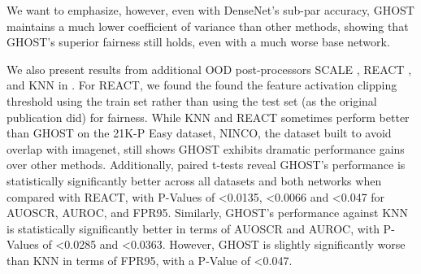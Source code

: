 We want to emphasize, however, even with DenseNet's sub-par accuracy, GHOST maintains a much lower coefficient of  variance than other methods, showing that GHOST's superior fairness still holds, even with a much worse base network.

We also present results from additional OOD post-processors SCALE \cite{xu2024scaling}, REACT \cite{sun2021react}, and KNN \cite{sun2022out} in . 
For REACT, we found the found the feature activation clipping threshold using the train set rather than using the test set (as the original publication did) for fairness.
While KNN and REACT sometimes perform better than GHOST on the 21K-P Easy dataset, NINCO, the dataset built to avoid overlap with imagenet, still shows GHOST exhibits dramatic performance gains over other methods.
Additionally, paired t-tests reveal GHOST's performance is statistically significantly better across all datasets and both networks when compared with REACT, with P-Values of <0.0135, <0.0066 and <0.047 for AUOSCR, AUROC, and FPR95.
Similarly, GHOST's performance against KNN is statistically significantly better in terms of AUOSCR and AUROC, with P-Values of <0.0285 and <0.0363.
However, GHOST is slightly significantly worse than KNN in terms of FPR95, with a P-Value of <0.047.
